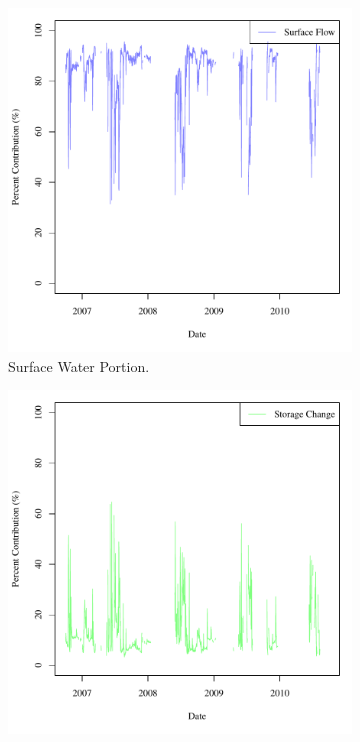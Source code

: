 \begin{figure}[htbp]
	\centering
	\begin{subfigure}{0.5\textwidth}
		\centering
		\includegraphics[width=\tableCustomSize]{"Figures/Results_DSR/Stochastic/M Water Contrib 1"}
		\caption{Surface Water Portion.}
	\end{subfigure}%
	\begin{subfigure}{0.5\textwidth}
		\centering
		\includegraphics[width=\tableCustomSize]{"Figures/Results_DSR/Stochastic/M Water Contrib 3"}

\end{subfigure}
\end{figure}
